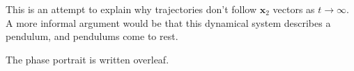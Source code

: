 \documentclass[10pt]{article}
\begin{document}
\begin{enumerate}
        This is an attempt to explain why trajectories don't follow
        $\mathbf{x}_2$ vectors as $t \rightarrow \infty$. A more informal
        argument would be that this dynamical system describes a pendulum, and
        pendulums come to rest.

        The phase portrait is written overleaf.

  \end{enumerate}
\end{document}
